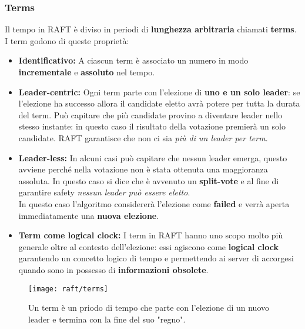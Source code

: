   \subsubsection{Terms}
  Il tempo in RAFT è diviso in periodi di \textbf{lunghezza arbitraria} chiamati \textbf{terms}. I term godono di queste proprietà:
  \begin{itemize}
    \item{\textbf{Identificativo:}}
    A ciascun term è associato un numero in modo \textbf{incrementale} e \textbf{assoluto} nel tempo.
    \item{\textbf{Leader-centric:}}
    Ogni term parte con l'elezione di \textbf{uno e un solo leader}: se l'elezione ha successo allora il candidate eletto avrà potere per tutta la durata del term. Può capitare che più candidate provino a diventare leader nello stesso instante: in questo caso il risultato della votazione premierà un solo candidate. RAFT garantisce che non ci sia \textit{più di un leader per term}.
    \item{\textbf{Leader-less:}}
    In alcuni casi può capitare che nessun leader emerga, questo avviene perché nella votazione non è stata ottenuta una maggioranza assoluta. In questo caso si dice che è avvenuto un \textbf{split-vote} e al fine di garantire safety \textit{nessun leader può essere eletto}.\\
    In questo caso l'algoritmo considererà l'elezione come \textbf{failed} e verrà aperta immediatamente una \textbf{nuova elezione}.
    \item{\textbf{Term come logical clock:}}
    I term in RAFT hanno uno scopo molto più generale oltre al contesto dell'elezione: essi agiscono come \textbf{logical clock} \cite{Lamport:1978} garantendo un concetto logico di tempo e permettendo ai server di accorgesi quando sono in possesso di \textbf{informazioni obsolete}.
  \end{itemize}
  
  \begin{figure}[H]
    \centering
    \texttt{[image: raft/terms]}
    \caption{Un term è un priodo di tempo che parte con l'elezione di un nuovo leader e termina con la fine del suo "regno".}
    \label{fig:figure3}
  \end{figure}

